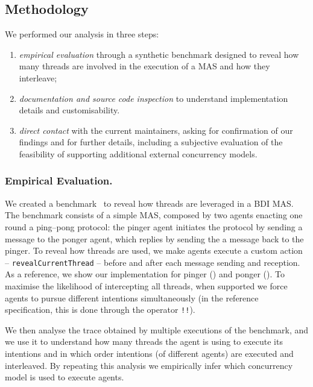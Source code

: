\subsection{Methodology}

We performed our analysis in three steps:
%
\begin{enumerate}
  \item \emph{empirical evaluation} through a synthetic benchmark
    designed to
    reveal how many threads are involved in the execution of a \ac{MAS} and how they interleave;
  \item \emph{documentation and source code inspection}
    to understand implementation details and customisability.
  \item \emph{direct contact} with the current maintainers,
    asking for confirmation of our findings and for further details,
    including a subjective evaluation of the feasibility of supporting additional external concurrency models.
\end{enumerate}

\subsubsection{Empirical Evaluation.}\label{par:benchmark}

We created a benchmark~\cite{Baiardi_BDI_Languages_Concurrency_2024} to reveal how threads are leveraged in a \ac{BDI} \ac{MAS}.
%
The benchmark consists of a simple \ac{MAS}, composed by two agents enacting one round a ping--pong protocol:
the pinger agent initiates the protocol by sending a message to the ponger agent,
which replies by sending the a message back to the pinger.
%
To reveal how threads are used,
we make agents execute a custom action
-- \texttt{revealCurrentThread} --
before and after each message sending and reception.
%
As a reference, we show our \jason{} implementation for
pinger () and ponger ().
%
To maximise the likelihood of intercepting all threads,
when supported
we force agents to pursue different intentions simultaneously
(in the reference specification, this is done through the \jason{} operator \texttt{!!}).
%

%

%
We then analyse the trace obtained
by multiple executions of the benchmark,
and we use it to understand
how many threads the agent is using to execute its intentions
and in which order intentions (of different agents) are executed and interleaved.
By repeating this analysis we empirically infer which concurrency model is used to execute agents.

